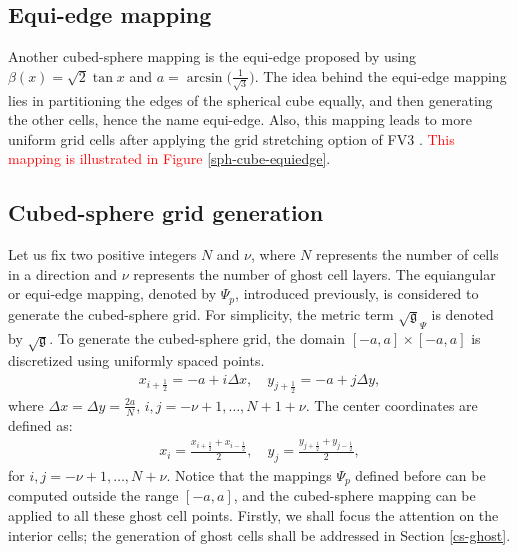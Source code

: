 \documentclass[preprint,12pt]{elsarticle}
\begin{document}
\begin{linenumbers}
\subsection{Equi-edge mapping}
\label{cs-equiedge}
Another cubed-sphere mapping is the equi-edge proposed by
\cite{chen:2021} using $\beta(x) = \sqrt{2}\tan{x}$ and
$a=\arcsin{\big(\frac{1}{\sqrt{3}}\big)}$.
The idea behind the equi-edge mapping lies in partitioning the edges of the spherical cube equally,
and then generating the other cells, hence the name equi-edge.
Also, this mapping leads to more uniform grid cells after applying the grid stretching option of FV3 \citep{harris:2016, chen:2021}.
\textcolor{red}{This mapping is illustrated in Figure \ref{sph-cube-equiedge}}.

\subsection{Cubed-sphere grid generation}
\label{cs-grid}
Let us fix two positive integers $N$ and $\nu$, where $N$ represents the number of cells in a direction and $\nu$ represents the number of ghost cell layers.
The equiangular or equi-edge mapping, denoted by $\Psi_p$, introduced previously, is considered to generate the cubed-sphere grid.
For simplicity, the metric term $\sqrt{\mathfrak{g}}_{\Psi}$ is denoted by $\sqrt{\mathfrak{g}}$.
To generate the cubed-sphere grid, the domain $[-a,a]\times[-a,a]$ is discretized using uniformly spaced points.
\begin{align}
\label{edge-coords}
x_{i+\frac{1}{2}} = -a+i\Delta x, \quad
y_{j+\frac{1}{2}} = -a+j\Delta y,
\end{align}
where $\Delta x = \Delta y = \frac{2a}{N}$, $i,j=-\nu+1,\ldots,N+1+\nu$. The center coordinates  are defined as:
\begin{align}
	\label{center-coords}
	x_{i} = \frac{x_{i+\frac{1}{2}}+x_{i-\frac{1}{2}}}{2}, \quad
	y_{j} = \frac{y_{j+\frac{1}{2}}+y_{j-\frac{1}{2}}}{2},
\end{align}
for $i,j=-\nu+1,\ldots,N+\nu$.
Notice that the mappings ${\Psi}_p$ defined before can be computed outside the range $[-a,a]$, and the cubed-sphere mapping can be applied to all these ghost cell points.
Firstly, we shall focus the attention on the interior cells; the generation of ghost cells shall be addressed in Section \ref{cs-ghost}.


\end{linenumbers}
\end{document}
